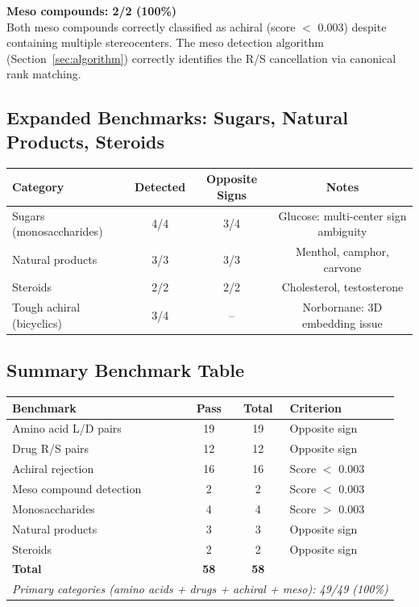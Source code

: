 \documentclass[11pt,a4paper]{article}
\begin{document}
\begin{keyresult}
\textbf{Meso compounds: 2/2 (100\%)} \\[4pt]
Both meso compounds correctly classified as achiral (score $<$ 0.003) despite
containing multiple stereocenters. The meso detection algorithm (Section~\ref{sec:algorithm})
correctly identifies the R/S cancellation via canonical rank matching.
\end{keyresult}

\subsection{Expanded Benchmarks: Sugars, Natural Products, Steroids}

\begin{center}
\begin{tabular}{lccc}
\toprule
\textbf{Category} & \textbf{Detected} & \textbf{Opposite Signs} & \textbf{Notes} \\
\midrule
Sugars (monosaccharides)    & 4/4 & 3/4 & Glucose: multi-center sign ambiguity \\
Natural products            & 3/3 & 3/3 & Menthol, camphor, carvone \\
Steroids                    & 2/2 & 2/2 & Cholesterol, testosterone \\
Tough achiral (bicyclics)   & 3/4 & --  & Norbornane: 3D embedding issue \\
\bottomrule
\end{tabular}
\end{center}

\subsection{Summary Benchmark Table}

\begin{center}
\begin{tabular}{lccl}
\toprule
\textbf{Benchmark} & \textbf{Pass} & \textbf{Total} & \textbf{Criterion} \\
\midrule
Amino acid L/D pairs       & 19 & 19 & Opposite sign \\
Drug R/S pairs             & 12 & 12 & Opposite sign \\
Achiral rejection          & 16 & 16 & Score $<$ 0.003 \\
Meso compound detection    & 2  & 2  & Score $<$ 0.003 \\
Monosaccharides            & 4  & 4  & Score $>$ 0.003 \\
Natural products           & 3  & 3  & Opposite sign \\
Steroids                   & 2  & 2  & Opposite sign \\
\midrule
\textbf{Total}             & \textbf{58} & \textbf{58} & \\
\midrule
\multicolumn{4}{l}{\textit{Primary categories (amino acids + drugs + achiral + meso): 49/49 (100\%)}} \\
\bottomrule
\end{tabular}
\end{center}
\end{document}
